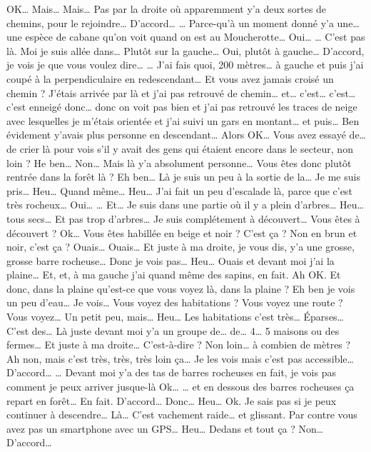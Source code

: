 \begin{dialogue}
  \Sec OK…
  \Req Mais… Mais… Pas par la droite où apparemment y'a deux sortes de
  chemins, pour le rejoindre…
  \Sec {} D'accord…
  \Req … Parce-qu’à un moment donné y'a une… une espèce de cabane
  qu'on voit quand on est au Moucherotte…
  \Sec {} Oui…
  \Req … C'est pas là. Moi je suis allée dans… Plutôt sur la gauche…
  \Sec {} Oui, plutôt à gauche… D'accord,
  je vois je que vous voulez dire…
  \Req … J'ai fais quoi, 200 mètres… à gauche et puis j'ai coupé à la
  perpendiculaire en redescendant…
  \Sec {} Et vous avez jamais croisé un
  chemin ?
  \Req J'étais arrivée par là et j'ai pas retrouvé de chemin… et…
  c'est… c'est… c'est enneigé donc… donc on voit pas bien et j'ai pas
  retrouvé les traces de neige avec lesquelles je m'étais orientée et
  j'ai suivi un gars en montant… et puis… Ben évidement y'avais plus
  personne en descendant…
  \Sec {} Alors OK… Vous avez essayé de… de
  crier là pour vois s'il y avait des gens qui étaient encore dans le
  secteur, non loin ?
  \Req He ben… Non… Mais là y'a absolument personne…
  \Sec {} Vous êtes donc plutôt rentrée dans
  la forêt là ?
  \Req Eh ben… Là je suis un peu à la sortie de la… Je me suis pris…
  Heu… Quand même… Heu… J'ai fait un peu d'escalade là, parce que
  c'est très rocheux…
  \Sec {} Oui…
  \Req … Et… Je suis dans une partie où il y a plein d'arbres… Heu…
  tous secs… Et pas trop d'arbres… Je suis complétement à découvert…
  \Sec {} Vous êtes à découvert ? Ok… Vous
  êtes habillée en beige et noir ? C'est ça ? Non en brun et noir,
  c'est ça ?
  \Req Ouais… Ouais… Et juste à ma droite, je vous dis, y'a une
  grosse, grosse barre rocheuse… Donc je vois pas… Heu… Ouais et
  devant moi j'ai la plaine… Et, et, à ma gauche j'ai quand même des
  sapins, en fait.
  \Sec Ah OK. Et donc, dans la plaine qu'est-ce que vous voyez là,
  dans la plaine ?
  \Req Eh ben je vois un peu d'eau… Je vois…
  \Sec {} Vous voyez des habitations ? Vous
  voyez une route ? Vous voyez…
  \Req Un petit peu, mais… Heu… Les habitations c'est très… Éparses…
  C'est des… Là juste devant moi y'a un groupe de… de… 4… 5 maisons ou
  des fermes… Et juste à ma droite…
  \Sec {} C'est-à-dire ? Non loin… à combien
  de mètres ?
  \Req Ah non, mais c'est très, très, très loin ça… Je les vois mais
  c'est pas accessible…
  \Sec {} D'accord…
  \Req … Devant moi y'a des tas de barres rocheuses en fait, je vois
  pas comment je peux arriver jusque-là
  \Sec {} Ok…
  \Req … et en dessous des barres rocheuses ça repart en forêt… En
  fait.
  \Sec D'accord… Donc… Heu… Ok.
  \Req Je sais pas si je peux continuer à descendre… Là… C'est
  vachement raide… et glissant.
  \Sec Par contre vous avez pas un smartphone avec un GPS… Heu… Dedans
  et tout ça ?
  \Req Non…
  \Sec D'accord…
\end{dialogue}
